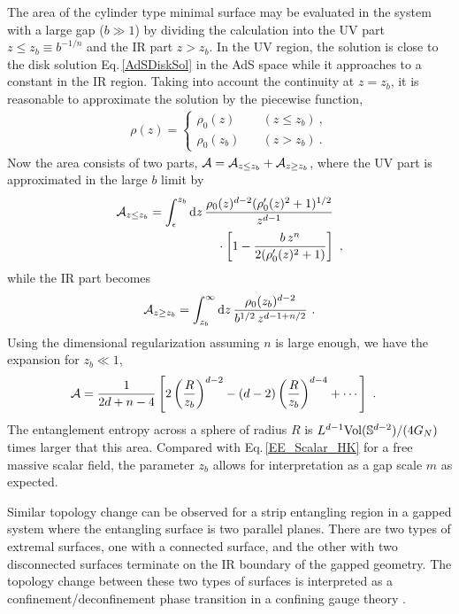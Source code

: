 The area of the cylinder type minimal surface may be evaluated in the system with a large gap ($b\gg 1$) by dividing the calculation into the UV part $z\leq z_b \equiv b^{-1/n}$ and the IR part $z> z_b$.
In the UV region, the solution is close to the disk solution Eq.\,\eqref{AdSDiskSol} in the AdS space while it approaches to a constant in the IR region.
Taking into account the continuity at $z=z_b$, it is reasonable to approximate the solution by the piecewise function,
\begin{align}
	\rho(z) = \begin{cases}
			\rho_0(z) & \quad (z\leq z_b) \ ,\\
			\rho_0(z_b) & \quad (z> z_b) \ .
			\end{cases}
\end{align}
Now the area consists of two parts, ${\cal A} = {\cal A}_{z\leq z_b} + {\cal A}_{z\geq z_b}$, where the UV part is approximated in the large $b$ limit by
\begin{align}
\begin{aligned}
	{\cal A}_{z\leq z_b} = \int_{\epsilon}^{z_b}\mathrm{d} z\,&\frac{\rho_0(z)^{d-2}(\rho_0'(z)^2 + 1)^{1/2}}{z^{d-1}} \\
		&\quad \cdot \left[ 1 - \frac{b\,z^n}{2(\rho_0'(z)^2 +1)}\right] \ ,
\end{aligned}
\end{align}
while	 the IR part becomes
\begin{align}
	{\cal A}_{z\geq z_b} = \int_{z_b}^\infty \mathrm{d} z\, \frac{\rho_0(z_b)^{d-2}}{b^{1/2}\,z^{d-1 + n/2}} \ .
\end{align}
Using the dimensional regularization assuming $n$ is large enough, we have the expansion for $z_b\ll 1$,
\begin{align}\label{EE_Sphere_Gap}
	{\cal A} &= \frac{1}{2d + n -4} \left[2 \left(\frac{R}{z_b}\right)^{d-2}  - (d-2) \left(\frac{R}{z_b}\right)^{d-4} + \cdots \right] \ .
\end{align}
The entanglement entropy across a sphere of radius $R$ is $L^{d-1}\text{Vol}(\mathbb{S}^{d-2})/(4G_N)$ times larger that this area.
Compared with Eq.\,\eqref{EE_Scalar_HK} for a free massive scalar field, the parameter $z_b$ allows for interpretation as a gap scale $m$ as expected.


Similar topology change can be observed for a strip entangling region in a gapped system where the entangling surface is two parallel planes.
There are two types of extremal surfaces, one with a connected surface, and the other with two disconnected surfaces terminate on the IR boundary of the gapped geometry.
The topology change between these two types of surfaces is interpreted as a confinement/deconfinement phase transition in a confining gauge theory \cite{Nishioka:2006gr,Klebanov:2007ws,Pakman:2008ui}.


